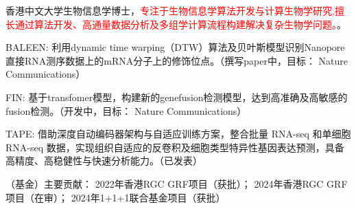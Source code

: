 

\begin{cvparagraph}

香港中文大学生物信息学博士，\textcolor{red}{专注于生物信息学算法开发与计算生物学研究,擅长通过算法开发、高通量数据分析及多组学计算流程构建解决复杂生物学问题。}。

\begin{cvitems} %
    \item {BALEEN: 利用dynamic time warping（DTW）算法及贝叶斯模型识别Nanopore直接RNA测序数据上的mRNA分子上的修饰位点。（撰写paper中，目标： Nature Communications）}
    \item {FIN: 基于transfomer模型，构建新的gene\-fusion检测模型，达到高准确及高敏感的fusion检测。（开发中，目标： Nature Communications）}
    \item {TAPE: 借助深度自动编码器架构与自适应训练方案，整合批量 RNA-seq 和单细胞 RNA-seq 数据，实现组织自适应的反卷积及细胞类型特异性基因表达预测，具备高精度、高稳健性与快速分析能力。（已发表）}
    \item {（基金）主要贡献： 2022年香港RGC GRF项目（获批）； 2024年香港RGC GRF项目（在审）； 2024年1+1+1联合基金项目（获批）}
\end{cvitems}


\end{cvparagraph}